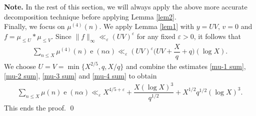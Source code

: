 \documentclass[11pt]{amsart}
\numberwithin{equation}{section}
\numberwithin{figure}{section}
\theoremstyle{definition}
\newcommand{\e}{\operatorname{e}}
\begin{document}
\noindent \textbf{Note.} In the rest of this section, we will always apply the above more accurate decomposition technique before applying Lemma \ref{lem2}. \\

Finally, we focus on $\mu^{(4)}(n)$. We apply Lemma \ref{lem1} with $y=UV$, $v=0$ and $f = \mu_{\leqslant U}*\mu_{\leqslant V}$. Since $\|f\|_{\infty} \ll_{\varepsilon} (UV)^{\varepsilon} $ for any fixed $\varepsilon>0$, it follows that
\begin{align}\label{mu-4 sum}
\sum_{n\leqslant X }\mu^{(4)}(n)\e(n\alpha) \ll_{\varepsilon} (UV)^{\varepsilon}\bigg( UV+ \dfrac{X}{q} + q\bigg)(\log X).
\end{align}
We choose $U=V=\min\{ X^{2/5}, q, X/q \}$ and combine the estimates \eqref{mu-1 sum}, \eqref{mu-2 sum}, \eqref{mu-3 sum} and \eqref{mu-4 sum} to obtain
\begin{align*}
    \sum_{n\leqslant X }\mu(n)\e(n\alpha) \ll_{\varepsilon} X^{4/5+\varepsilon}+ \dfrac{X(\log X)^3}{q^{1/2}} + X^{1/2}q^{1/2}(\log X)^3.
\end{align*} 
This ends the proof. \qed
\end{document}
